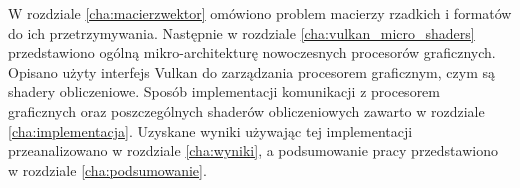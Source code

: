 W rozdziale \ref{cha:macierzwektor} omówiono problem macierzy rzadkich i formatów do ich przetrzymywania.
Następnie w rozdziale \ref{cha:vulkan_micro_shaders} przedstawiono ogólną mikro-architekturę nowoczesnych procesorów graficznych.
Opisano użyty interfejs Vulkan do zarządzania procesorem graficznym, czym są shadery obliczeniowe.
Sposób implementacji komunikacji z procesorem graficznych oraz poszczególnych shaderów obliczeniowych zawarto w rozdziale \ref{cha:implementacja}.
Uzyskane wyniki używając tej implementacji przeanalizowano w rozdziale \ref{cha:wyniki}, a podsumowanie pracy przedstawiono w rozdziale \ref{cha:podsumowanie}.















